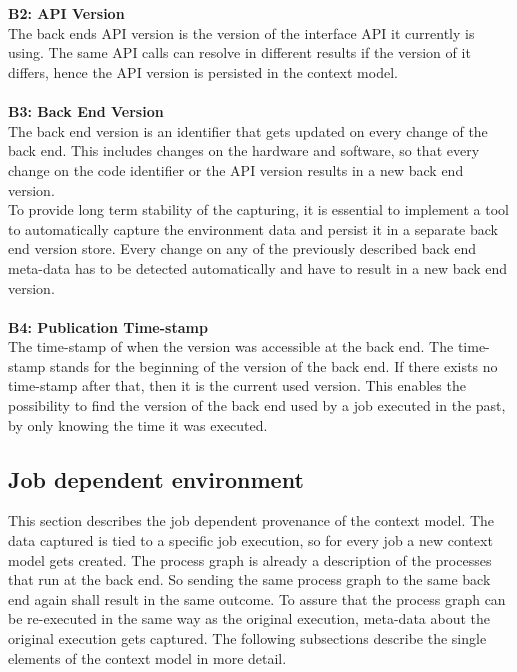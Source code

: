 \documentclass[draft,final]{vutinfth} %
\begin{document}
\\ \\
\textbf{B2: API Version} \\
The back ends API version is the version of the interface API it currently is using. The same API calls can resolve in different results if the version of it differs, hence the API version is persisted in the context model. 
\\ \\
\textbf{B3: Back End Version} \\
The back end version is an identifier that gets updated on every change of the back end. This includes changes on the hardware and software, so that every change on the code identifier or the API version results in a new back end version.   
\\
To provide long term stability of the capturing, it is essential to implement a tool to automatically capture the environment data and persist it in a separate back end version store. Every change on any of the previously described back end meta-data has to be detected automatically and have to result in a new back end version.  
\\ \\
\textbf{B4: Publication Time-stamp} \\
The time-stamp of when the version was accessible at the back end. The time-stamp stands for the beginning of the version of the back end. If there exists no time-stamp after that, then it is the current used version. This enables the possibility to find the version of the back end used by a job executed in the past, by only knowing the time it was executed.     

\subsection{Job dependent environment}\label{Design:Job dependent provenance}
This section describes the job dependent provenance of the context model. The data captured is tied to a specific job execution, so for every job a new context model gets created. The process graph is already a description of the processes that run at the back end. So sending the same process graph to the same back end again shall result in the same outcome. To assure that the process graph can be re-executed in the same way as the original execution, meta-data about the original execution gets captured. 
The following subsections describe the single elements of the context model in more detail. 
\end{document}
